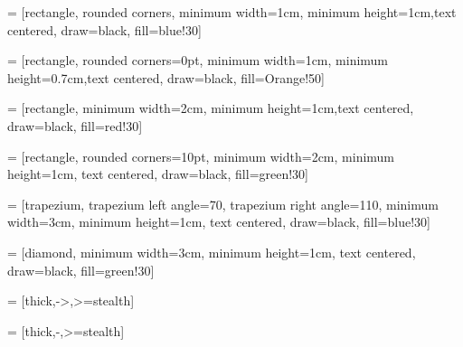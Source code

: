 
\usepackage{tikz}
\usetikzlibrary{shapes, shapes.geometric, arrows, shadows, positioning, decorations.markings, arrows.meta, trees}

 = [rectangle, rounded corners, minimum width=1cm, minimum height=1cm,text centered, draw=black, fill=blue!30]

 = [rectangle, rounded corners=0pt, minimum width=1cm, minimum height=0.7cm,text centered, draw=black, fill=Orange!50]

 = [rectangle, minimum width=2cm, minimum height=1cm,text centered, draw=black, fill=red!30]

 = [rectangle, rounded corners=10pt, minimum width=2cm, minimum height=1cm, text centered, draw=black, fill=green!30]


 = [trapezium, trapezium left angle=70, trapezium right angle=110, minimum width=3cm, minimum height=1cm, text centered, draw=black, fill=blue!30]

 = [diamond, minimum width=3cm, minimum height=1cm, text centered, draw=black, fill=green!30]

 = [thick,->,>=stealth]

 = [thick,-,>=stealth]


\usepackage{tikz-qtree}
